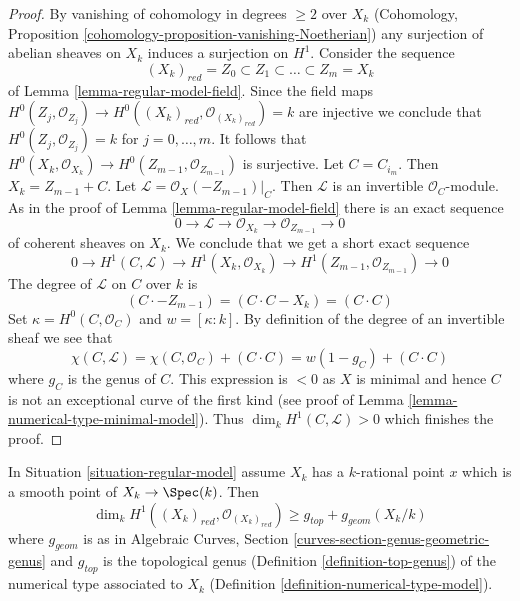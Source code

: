 \begin{proof}
By vanishing of cohomology in degrees $\geq 2$ over $X_k$
(Cohomology, Proposition \ref{cohomology-proposition-vanishing-Noetherian})
any surjection of abelian sheaves on $X_k$ induces a surjection on $H^1$.
Consider the sequence
$$
(X_k)_{red} = Z_0 \subset Z_1 \subset \ldots \subset Z_m = X_k
$$
of Lemma \ref{lemma-regular-model-field}. Since the field maps
$H^0(Z_j, \mathcal{O}_{Z_j}) \to
H^0((X_k)_{red}, \mathcal{O}_{(X_k)_{red}}) = k$
are injective we conclude that $H^0(Z_j, \mathcal{O}_{Z_j}) = k$ for
$j = 0, \ldots, m$. It follows that
$H^0(X_k, \mathcal{O}_{X_k}) \to H^0(Z_{m - 1}, \mathcal{O}_{Z_{m - 1}})$
is surjective. Let $C = C_{i_m}$. Then $X_k = Z_{m - 1} + C$.
Let $\mathcal{L} = \mathcal{O}_X(-Z_{m - 1})|_C$.
Then $\mathcal{L}$ is an invertible $\mathcal{O}_C$-module.
As in the proof of Lemma \ref{lemma-regular-model-field}
there is an exact sequence
$$
0 \to \mathcal{L} \to \mathcal{O}_{X_k} \to \mathcal{O}_{Z_{m - 1}} \to 0
$$
of coherent sheaves on $X_k$. We conclude that
we get a short exact sequence
$$
0 \to
H^1(C, \mathcal{L}) \to H^1(X_k, \mathcal{O}_{X_k}) \to
H^1(Z_{m - 1}, \mathcal{O}_{Z_{m - 1}}) \to 0
$$
The degree of $\mathcal{L}$ on $C$ over $k$ is
$$
(C \cdot -Z_{m - 1}) = (C \cdot C - X_k) = (C \cdot C)
$$
Set $\kappa = H^0(C, \mathcal{O}_C)$ and $w = [\kappa : k]$.
By definition of the degree of an invertible sheaf we see that
$$
\chi(C, \mathcal{L}) =
\chi(C, \mathcal{O}_C) + (C \cdot C) =
w(1 - g_C) + (C \cdot C)
$$
where $g_C$ is the genus of $C$. This expression is $< 0$ as $X$ is minimal
and hence $C$ is not an exceptional curve of the first kind
(see proof of Lemma \ref{lemma-numerical-type-minimal-model}).
Thus $\dim_k H^1(C, \mathcal{L}) > 0$ which finishes the proof.
\end{proof}

\begin{lemma}
\label{lemma-genus-reduction-bigger-than}
In Situation \ref{situation-regular-model} assume $X_k$ has a $k$-rational
point $x$ which is a smooth point of $X_k \to \Spec(k)$. Then
$$
\dim_k H^1((X_k)_{red}, \mathcal{O}_{(X_k)_{red}}) \geq
g_{top} + g_{geom}(X_k/k)
$$
where $g_{geom}$ is as in
Algebraic Curves, Section \ref{curves-section-genus-geometric-genus}
and $g_{top}$ is the topological genus
(Definition \ref{definition-top-genus})
of the numerical type associated to $X_k$
(Definition \ref{definition-numerical-type-model}).
\end{lemma}

